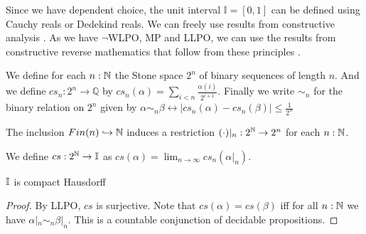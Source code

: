 Since we have dependent choice, the unit interval $\mathbb I = [0,1]$ can be defined using 
Cauchy reals or Dedekind reals. 
We can freely use results from constructive analysis \cite{Bishop}. 
As we have $\neg$WLPO, MP and LLPO, we can use the results from 
constructive reverse mathematics that follow from these principles \cite{ReverseMathsBishop, HannesDiener}. 
\begin{definition}
  We define for each $n:\mathbb{N}$ the Stone space $2^n$ of binary sequences of length $n$.
  And we define $cs_n:2^n \to \mathbb Q$ by 
  $cs_n(\alpha) = \sum_{i < n } \frac{\alpha(i)}{2^{i+1}}.$
  Finally we write $\sim_n$ for the binary relation on $2^n$ given by 
  $\alpha\sim_n \beta 
  \leftrightarrow \left|cs_n(\alpha) - cs_n(\beta)\right|\leq\frac{1}{2^n}$
\end{definition}
\begin{remark}
  The inclusion $Fin(n) \hookrightarrow \mathbb{N}$ induces a restriction 
  $(\cdot)|_n : 2^{\mathbb{N}} \to 2^n$ for each $n:\mathbb{N}$. 
\end{remark}
\begin{definition}
  We define $cs:2^{\mathbb{N}} \to \mathbb{I}$ as 
  $cs(\alpha) = \lim_{n\to\infty} cs_n(\alpha|_n)$. 
\end{definition}

\begin{theorem}\label{IntervalIsCHaus}
  $\mathbb{I}$ is compact Hausdorff
\end{theorem}
\begin{proof}
  By LLPO, $cs$ is surjective.   
  Note that $cs(\alpha) = cs(\beta)$ iff 
  for all $n:\mathbb{N}$ we have $\alpha|_n \sim_n \beta|_n$. 
  This is a countable conjunction of decidable propositions.
\end{proof}


